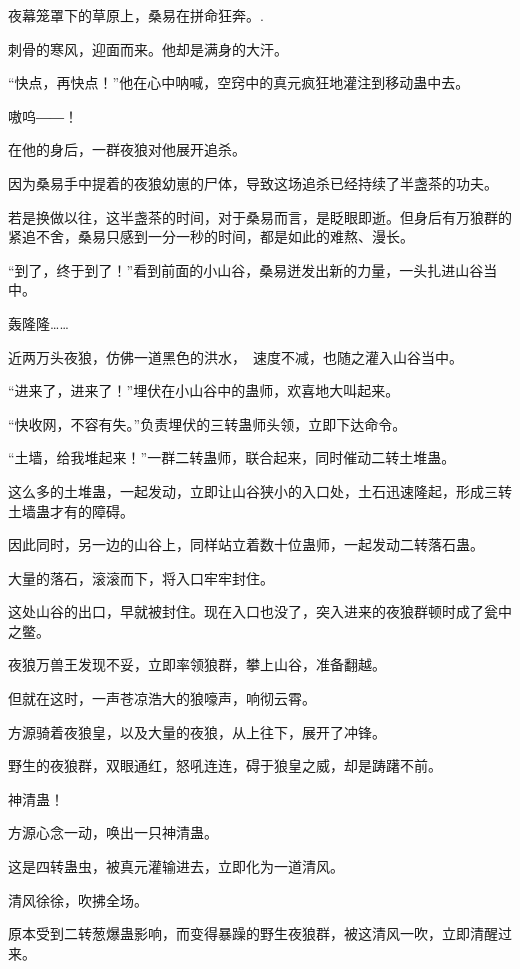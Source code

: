 
\begin{this_body}

夜幕笼罩下的草原上，桑易在拼命狂奔。.

刺骨的寒风，迎面而来。他却是满身的大汗。

“快点，再快点！”他在心中呐喊，空窍中的真元疯狂地灌注到移动蛊中去。

嗷呜――！

在他的身后，一群夜狼对他展开追杀。

因为桑易手中提着的夜狼幼崽的尸体，导致这场追杀已经持续了半盏茶的功夫。

若是换做以往，这半盏茶的时间，对于桑易而言，是眨眼即逝。但身后有万狼群的紧追不舍，桑易只感到一分一秒的时间，都是如此的难熬、漫长。

“到了，终于到了！”看到前面的小山谷，桑易迸发出新的力量，一头扎进山谷当中。

轰隆隆……

近两万头夜狼，仿佛一道黑色的洪水，　速度不减，也随之灌入山谷当中。

“进来了，进来了！”埋伏在小山谷中的蛊师，欢喜地大叫起来。

“快收网，不容有失。”负责埋伏的三转蛊师头领，立即下达命令。

“土墙，给我堆起来！”一群二转蛊师，联合起来，同时催动二转土堆蛊。

这么多的土堆蛊，一起发动，立即让山谷狭小的入口处，土石迅速隆起，形成三转土墙蛊才有的障碍。

因此同时，另一边的山谷上，同样站立着数十位蛊师，一起发动二转落石蛊。

大量的落石，滚滚而下，将入口牢牢封住。

这处山谷的出口，早就被封住。现在入口也没了，突入进来的夜狼群顿时成了瓮中之鳖。

夜狼万兽王发现不妥，立即率领狼群，攀上山谷，准备翻越。

但就在这时，一声苍凉浩大的狼嚎声，响彻云霄。

方源骑着夜狼皇，以及大量的夜狼，从上往下，展开了冲锋。

野生的夜狼群，双眼通红，怒吼连连，碍于狼皇之威，却是踌躇不前。

神清蛊！

方源心念一动，唤出一只神清蛊。

这是四转蛊虫，被真元灌输进去，立即化为一道清风。

清风徐徐，吹拂全场。

原本受到二转葱爆蛊影响，而变得暴躁的野生夜狼群，被这清风一吹，立即清醒过来。


\end{this_body}
